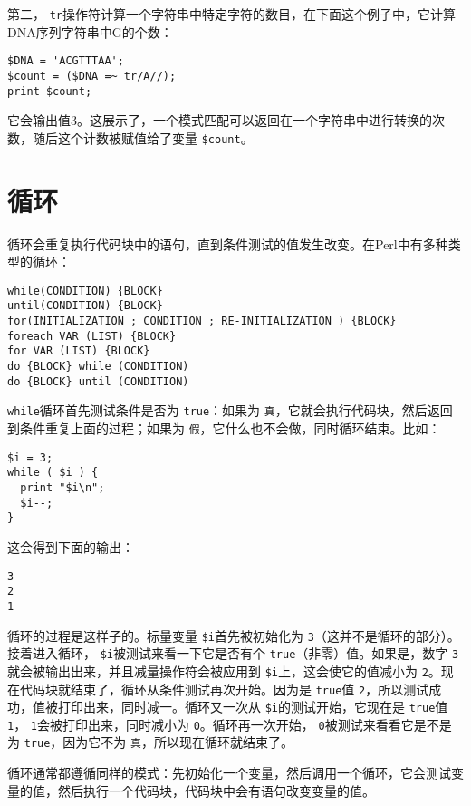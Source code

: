 第二， \verb|tr|操作符计算一个字符串中特定字符的数目，在下面这个例子中，它计算DNA序列字符串中G的个数：

\begin{lstlisting}
$DNA = 'ACGTTTAA';
$count = ($DNA =~ tr/A//);
print $count;
\end{lstlisting}

它会输出值3。这展示了，一个模式匹配可以返回在一个字符串中进行转换的次数，随后这个计数被赋值给了变量 \verb|$count|。

\section{循环}
循环会重复执行代码块中的语句，直到条件测试的值发生改变。在Perl中有多种类型的循环：

\begin{lstlisting}
while(CONDITION) {BLOCK}
until(CONDITION) {BLOCK}
for(INITIALIZATION ; CONDITION ; RE-INITIALIZATION ) {BLOCK}
foreach VAR (LIST) {BLOCK}
for VAR (LIST) {BLOCK}
do {BLOCK} while (CONDITION)
do {BLOCK} until (CONDITION)
\end{lstlisting}

 \verb|while|循环首先测试条件是否为 \verb|true|：如果为 \verb|真|，它就会执行代码块，然后返回到条件重复上面的过程；如果为 \verb|假|，它什么也不会做，同时循环结束。比如：

\begin{lstlisting}
$i = 3;
while ( $i ) {
  print "$i\n";
  $i--;
}
\end{lstlisting}

这会得到下面的输出：

\begin{lstlisting}
3
2
1
\end{lstlisting}

循环的过程是这样子的。标量变量 \verb|$i|首先被初始化为 \verb|3|（这并不是循环的部分）。接着进入循环， \verb|$i|被测试来看一下它是否有个 \verb|true|（非零）值。如果是，数字 \verb|3|就会被输出出来，并且减量操作符会被应用到 \verb|$i|上，这会使它的值减小为 \verb|2|。现在代码块就结束了，循环从条件测试再次开始。因为是 \verb|true|值 \verb|2|，所以测试成功，值被打印出来，同时减一。循环又一次从 \verb|$i|的测试开始，它现在是 \verb|true|值 \verb|1|， \verb|1|会被打印出来，同时减小为 \verb|0|。循环再一次开始， \verb|0|被测试来看看它是不是为 \verb|true|，因为它不为 \verb|真|，所以现在循环就结束了。

循环通常都遵循同样的模式：先初始化一个变量，然后调用一个循环，它会测试变量的值，然后执行一个代码块，代码块中会有语句改变变量的值。

